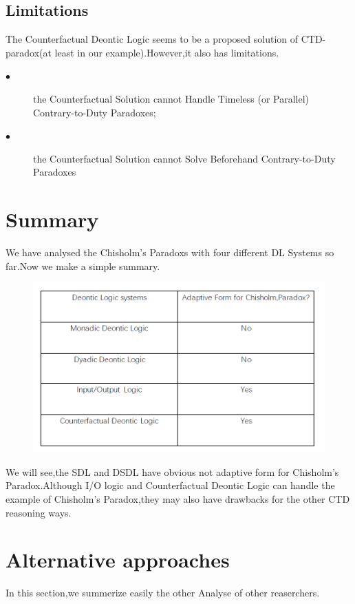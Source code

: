 \documentclass{article}
\begin{document}
\subsection{Limitations}
The Counterfactual Deontic Logic seems to be a proposed solution of CTD-paradox(at least in our example).However,it also has limitations.\\
\begin{description}
\item[$\bullet$]the Counterfactual Solution cannot Handle Timeless (or Parallel)
Contrary-to-Duty Paradoxes;
\item[$\bullet$]the Counterfactual Solution cannot Solve Beforehand
Contrary-to-Duty Paradoxes
\end{description}
\newpage
\section{Summary}
We have analysed the Chisholm's Paradoxs with four different DL Systems so far.Now we make a simple summary.
\begin{figure}[hb]
\centering
\includegraphics[scale=0.5]{summary.png}

\label{fig_framework}
\end{figure}
We will see,the SDL and DSDL have obvious not adaptive form for Chisholm's Paradox.Although I/O logic and Counterfactual Deontic Logic can handle the example of Chisholm's Paradox,they may also have drawbacks for the other CTD reasoning ways.
\section{Alternative approaches}
In this section,we summerize easily the other Analyse of other reaserchers.\\
\end{document}
